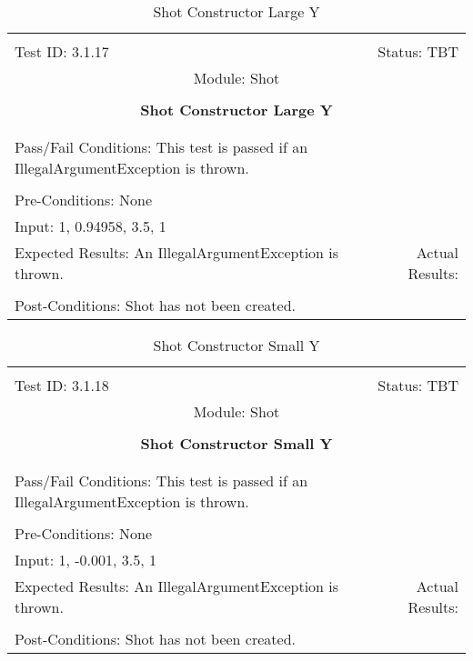 \documentclass[titlepage]{article}
\begin{document}
\begin{center}%
\begin{table}
\begin{tabular}{|l r|}\hline&\\[-2mm]
	Test ID: 3.1.17	&Status: TBT\\[-3mm]
	\multicolumn{2}{|c|}{Module: Shot}\\&\\
	\multicolumn{2}{|c|}{\textbf{\large{Shot Constructor Large Y}}}\\&\\\hline&\\[-3mm]
	\multicolumn{2}{|p{\textwidth}|}{Pass/Fail Conditions: This test is passed if an IllegalArgumentException is thrown.}\\[1mm]\hline&\\[-3mm]
	\multicolumn{2}{|p{\textwidth}|}{Pre-Conditions: None}\\[4mm]
	\multicolumn{2}{|p{\textwidth}|}{Input: 1, 0.94958, 3.5, 1}\\[2mm]\hline
	\multicolumn{1}{|p{0.49\textwidth}}{Expected Results: An IllegalArgumentException is thrown.}	&\multicolumn{1}{|p{0.45\textwidth}|}{Actual Results: }\\\hline&\\[-3mm]
	\multicolumn{2}{|p{\textwidth}|}{Post-Conditions: Shot has not been created.}\\\hline
\end{tabular}
\caption{Shot Constructor Large Y}
\end{table}
\end{center}

\begin{center}%
\begin{table}
\begin{tabular}{|l r|}\hline&\\[-2mm]
	Test ID: 3.1.18	&Status: TBT\\[-3mm]
	\multicolumn{2}{|c|}{Module: Shot}\\&\\
	\multicolumn{2}{|c|}{\textbf{\large{Shot Constructor Small Y}}}\\&\\\hline&\\[-3mm]
	\multicolumn{2}{|p{\textwidth}|}{Pass/Fail Conditions: This test is passed if an IllegalArgumentException is thrown.}\\[1mm]\hline&\\[-3mm]
	\multicolumn{2}{|p{\textwidth}|}{Pre-Conditions: None}\\[4mm]
	\multicolumn{2}{|p{\textwidth}|}{Input: 1, -0.001, 3.5, 1}\\[2mm]\hline
	\multicolumn{1}{|p{0.49\textwidth}}{Expected Results: An IllegalArgumentException is thrown.}	&\multicolumn{1}{|p{0.45\textwidth}|}{Actual Results: }\\\hline&\\[-3mm]
	\multicolumn{2}{|p{\textwidth}|}{Post-Conditions: Shot has not been created.}\\\hline
\end{tabular}
\caption{Shot Constructor Small Y}
\end{table}
\end{center}
\end{document}
